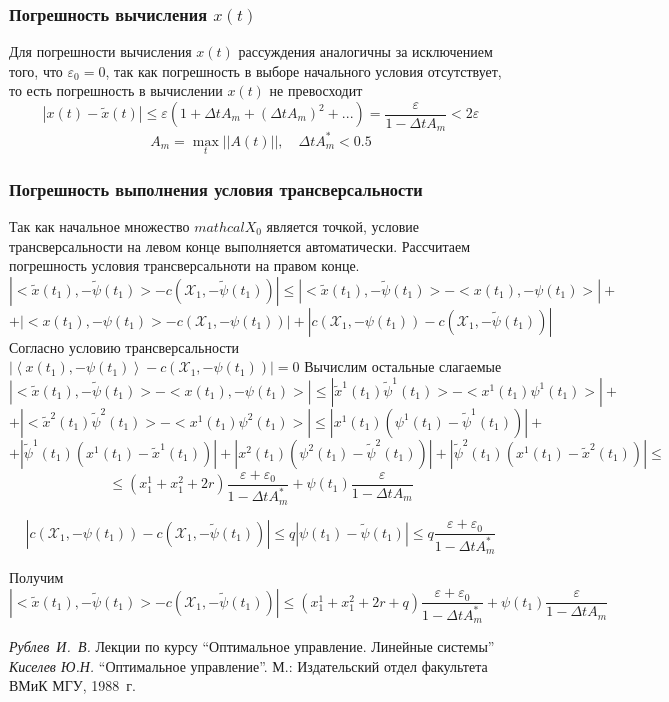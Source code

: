 \documentclass{article}
\begin{document}
    \subsubsection{Погрешность вычисления $x(t)$}
        Для погрешности вычисления $x(t)$ рассуждения аналогичны за исключением того, что $\varepsilon_0 = 0$, так как погрешность в выборе начального условия отсутствует, то есть погрешность в вычислении $x(t)$ не превосходит
        $$|x(t)-\tilde x(t)|\leq{\varepsilon (1 + \Delta tA_m + (\Delta tA_m)^2 + ...) = \frac{\varepsilon }{1 - \Delta tA_m}} < 2\varepsilon$$
        $$A_m = \max\limits_{t}^{}||A(t)||,\quad {\Delta t{A^*_m} < 0.5}$$
    \subsubsection{Погрешность выполнения условия трансверсальности}
        Так как начальное множество $mathcal{X}_0$ является точкой, условие трансверсальности на левом конце выполняется автоматически. Рассчитаем погрешность условия трансверсальноти на правом конце.
        $$|<\tilde x(t_1),-\tilde\psi(t_1)>-c(\mathcal{X}_1, -\tilde\psi(t_1))| \leq |<\tilde x(t_1),-\tilde\psi(t_1)>-<x(t_1),-\psi(t_1)>|+$$
        $$+|< x(t_1),-\psi(t_1)>-c(\mathcal{X}_1, -\psi(t_1))|+|c(\mathcal{X}_1, -\psi(t_1))-c(\mathcal{X}_1, -\tilde\psi(t_1))|$$
        Согласно условию трансверсальности $|{\left<x(t_1), -\psi(t_1)\right> - c(\mathcal{X}_1, -\psi(t_1))}| = 0$
        Вычислим остальные слагаемые
        $$ |<\tilde x(t_1),-\tilde\psi(t_1)>-<x(t_1),-\psi(t_1)>|\leq |\tilde x^1(t_1)\tilde\psi^1(t_1)>-<x^1(t_1)\psi^1(t_1)>|+$$
        $$+|<\tilde x^2(t_1)\tilde\psi^2(t_1)>-<x^1(t_1)\psi^2(t_1)>| \leq |x^1(t_1)(\psi^1(t_1)-\tilde\psi^1(t_1))|+ $$
        $$+|\tilde\psi^1(t_1)(x^1(t_1)-\tilde x^1(t_1))| + |x^2(t_1)(\psi^2(t_1)-\tilde\psi^2(t_1))|+ |\tilde\psi^2(t_1)(x^1(t_1)-\tilde x^2(t_1))| \leq$$
        $$\leq (x_1^1+x_1^2+2r)\frac{\varepsilon + \varepsilon_0}{1 - \Delta tA^*_m} + \psi(t_1)\frac{\varepsilon }{1 - \Delta tA_m}$$
        
        $$|c(\mathcal{X}_1, -\psi(t_1))-c(\mathcal{X}_1, -\tilde\psi(t_1))| \leq q|\psi(t_1)-\tilde\psi(t_1)| \leq q\frac{\varepsilon + \varepsilon_0}{1 - \Delta tA^*_m}$$
        
        Получим
        $$|<\tilde x(t_1),-\tilde\psi(t_1)>-c(\mathcal{X}_1, -\tilde\psi(t_1))| \leq (x_1^1+x_1^2+2r+q)\frac{\varepsilon + \varepsilon_0}{1 - \Delta tA^*_m} + \psi(t_1)\frac{\varepsilon }{1 - \Delta tA_m}$$
        



\newpage
\begin{thebibliography}{9}
 {\it Рублев~И.~В.} {\rm Лекции по курсу ``Оптимальное управление. Линейные системы''}
 {\it Киселев Ю.Н.} {\rm ``Оптимальное управление''. М.: Издательский отдел факультета ВМиК МГУ, 1988~г.}
\end{thebibliography}
\end{document}
